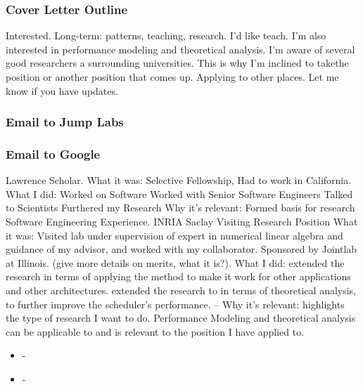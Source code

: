 \begin{frame}
\frametitle{Cover Letter Outline} 
  \begin{outline}[enumerate] 
    \tiny \1 {\tiny Interested.}
    \tiny \1 {\tiny Long-term: patterns, teaching, research. I'd like teach.}
    \tiny \1 {\tiny I'm also interested in performance modeling and theoretical analysis. I'm aware of several good researchers a surrounding universities. This is why I'm inclined to takethe position or another position that comes up.}
    \tiny \1 {\tiny Applying to other places.}
    \tiny \1 {\tiny Let me know if you have updates.}
  \end{outline}  
\end{frame} 

\begin{frame}
\frametitle{Email to Jump Labs}
\end{frame}

\begin{frame} 
\frametitle{Email to Google} 
\begin{outline}[enumerate]
\tiny \1 {\tiny Lawrence Scholar.} 
\tiny \2 {\tiny What it was: Selective Fellowship, Had to work in
  California.}
\tiny \2 {\tiny What I did:} 
\tiny \3 {\tiny Worked on Software }
\tiny \3 {\tiny Worked with Senior Software Engineers}  
\tiny \3 {\tiny Talked to Scientists} 
\tiny \3 {\tiny Furthered my Research}
\tiny \2 {\tiny Why it's relevant:  } 
\tiny \3 {\tiny Formed basis for research}
\tiny \3 {\tiny Software Engineering Experience.}
\tiny \1 {\tiny INRIA Saclay Visiting Research Position } 
\tiny \2 {\tiny What it was: }
\tiny \3 {\tiny Visited lab under supervision of expert in numerical
  linear algebra and guidance of my advisor, and worked with my
  collaborator. Sponsored by Jointlab at Illinois. (give more details
  on merits, what it is?).}
\tiny \2 {\tiny What I did:}
\tiny \3 {\tiny extended the research in terms of applying the method
  to make it work for other applications and other architectures.    } 
\tiny \3 {\tiny extended the research to in terms of theoretical
  analysis, to further improve the scheduler's performance. --} 
\tiny \2 {\tiny Why it's relevant:}
\tiny \2 {\tiny highlights the type of research I want to do.}
\tiny \2 {\tiny Performance Modeling and theoretical analysis can be
  applicable to and is relevant to the position I have applied to.} 
\end{outline}
\begin{itemize}
\tiny \item \tiny -
\item \tiny -
\end{itemize}
\end{frame} 

